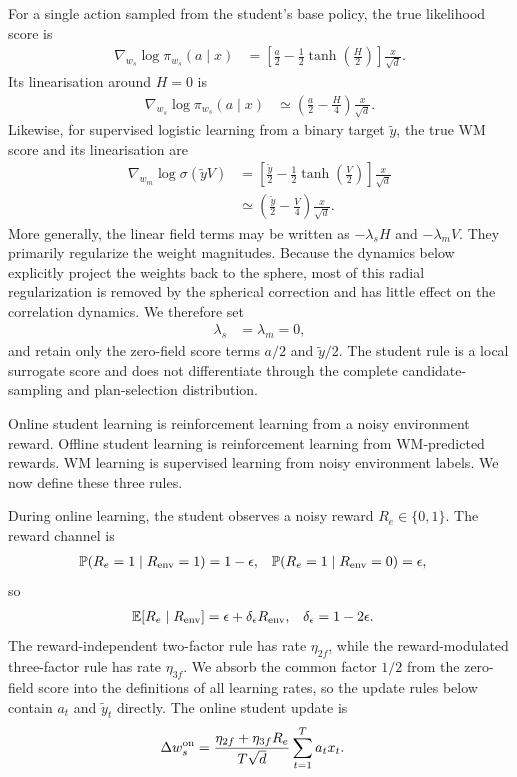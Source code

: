 \documentclass{article}
\begin{document}
For a single action sampled from the student's base policy, the true likelihood score is
\begin{align}
\nabla_{w_s}\log \pi_{w_s}(a\mid x) &= \left[\frac{a}{2}-\frac12\tanh\left(\frac{H}{2}\right)\right]\frac{x}{\sqrt d}.
\end{align}
Its linearisation around $H=0$ is
\begin{align}
\nabla_{w_s}\log \pi_{w_s}(a\mid x) &\simeq \left(\frac{a}{2}-\frac{H}{4}\right)\frac{x}{\sqrt d}.
\end{align}
Likewise, for supervised logistic learning from a binary target $\tilde y$, the true WM score and its linearisation are
\begin{align}
\nabla_{w_m}\log \sigma(\tilde yV) &= \left[\frac{\tilde y}{2}-\frac12\tanh\left(\frac{V}{2}\right)\right]\frac{x}{\sqrt d} \\
&\simeq \left(\frac{\tilde y}{2}-\frac{V}{4}\right)\frac{x}{\sqrt d}.
\end{align}
More generally, the linear field terms may be written as $-\lambda_sH$ and $-\lambda_mV$. They primarily regularize the weight magnitudes. Because the dynamics below explicitly project the weights back to the sphere, most of this radial regularization is removed by the spherical correction and has little effect on the correlation dynamics. We therefore set
\begin{align}
\lambda_s &= \lambda_m=0,
\end{align}
and retain only the zero-field score terms $a/2$ and $\tilde y/2$. The student rule is a local surrogate score and does not differentiate through the complete candidate-sampling and plan-selection distribution.

Online student learning is reinforcement learning from a noisy environment reward. Offline student learning is reinforcement learning from WM-predicted rewards. WM learning is supervised learning from noisy environment labels. We now define these three rules.

During online learning, the student observes a noisy reward $R_e\in\{0,1\}$. The reward channel is
\begin{align}
\mathbb P(R_e=1\mid R_{\rm env}=1) &= 1-\epsilon, & \mathbb P(R_e=1\mid R_{\rm env}=0) &= \epsilon,
\end{align}
so
\begin{align}
\mathbb E[R_e\mid R_{\rm env}] &= \epsilon+\delta_\epsilon R_{\rm env}, & \delta_\epsilon &= 1-2\epsilon.
\end{align}
The reward-independent two-factor rule has rate $\eta_{2f}$, while the reward-modulated three-factor rule has rate $\eta_{3f}$. We absorb the common factor $1/2$ from the zero-field score into the definitions of all learning rates, so the update rules below contain $a_t$ and $\tilde y_t$ directly. The online student update is
\begin{align}
\Delta w_s^{\rm on} &= \frac{\eta_{2f}+\eta_{3f}R_e}{T\sqrt d}\sum_{t=1}^T a_tx_t.
\end{align}
\end{document}

